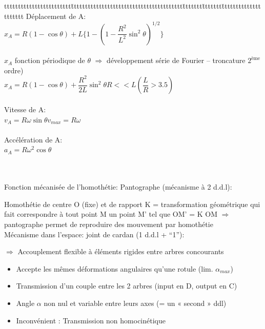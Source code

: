 \begin{bluebox}
\begin{tabbing}
tttttttttttttttttttttttt\=tttttttttttttttttttttttttttttttttttttttt\=ttttttt\=ttttttt\=ttttttttttttttttttttt\kill
Déplacement de A:\\
\>$x_A=R(1-\cos\theta)+L\{1-(1-\dfrac{R^2}{L^2}\sin^2\theta)^{1/2}\}$\\\\
$x_A$ fonction périodique de $\theta$ $\Rightarrow$ développement série de Fourier – troncature $2^{\text{ème}}$ ordre)\\
$x_A=R(1-\cos\theta)+\dfrac{R^2}{2L}\sin^2\theta$\>\>$R<<L$\>\>$(\dfrac{L}{R}>3.5)$\\\\
Vitesse de A:\\
$v_A=R\omega\sin\theta$\>\>\>$v_{max}=R\omega$\\\\
Accélération de A:\\
$a_A=R\omega^2\cos\theta$
\end{tabbing}
\end{bluebox}\\\\

Fonction mécanisée de l’homothétie: Pantographe (mécanisme à 2 d.d.l):

{\color{orange}Homothétie} de centre O (fixe) et de rapport K = transformation géométrique qui fait correspondre à tout point M un point M’ tel que OM’ = K OM
$\Rightarrow$ pantographe permet de reproduire des mouvement par homothétie\\

Mécanisme dans l'espace: joint de cardan (1 d.d.l + “1”):

$\Rightarrow$ Accouplement {\color{orange}flexible} à éléments rigides entre arbres concourants\\
\begin{itemize}
\renewcommand{\labelitemi}{$\bullet$}
\item{Accepte les mêmes déformations angulaires qu’une rotule (lim. $\alpha_{max}$)}
\item{Transmission d’un couple entre les 2 arbres (input en D, output en C)}
\item{Angle $\alpha$ non nul et variable entre leurs axes (= un « second » ddl)}
\item{{\color{red}Inconvénient} : Transmission non homocinétique}\\
\end{itemize}

